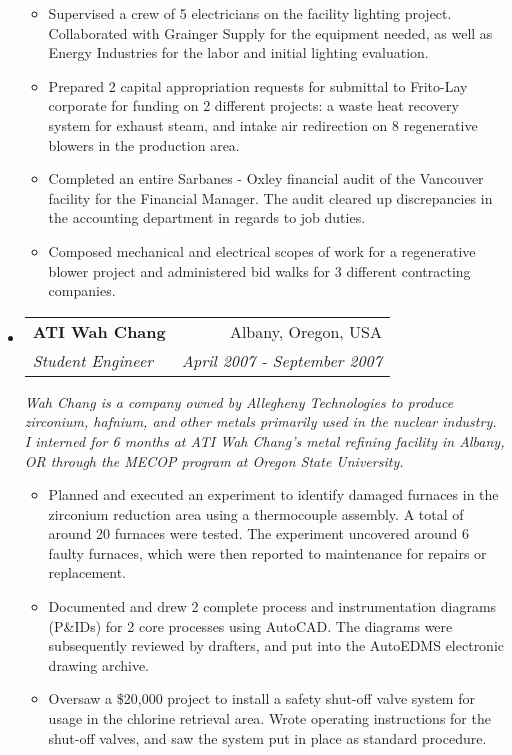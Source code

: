 \documentclass[a4paper,11pt]{article}
\makeatletter
\newcommand{\resitem}[1]{\item #1 \vspace{-2pt}}
\newcommand{\ressubheading}[4]{
\begin{tabular*}{6.5in}{l@{\cftdotfill{\cftsecdotsep}\extracolsep{\fill}}r}
		\textbf{#1} & #2 \\
		\textit{#3} & \textit{#4} \\
\end{tabular*}\vspace{-6pt}}
\makeatother
\begin{document}
\begin{itemize}
\begin{itemize}
			\resitem{Supervised a crew of 5 electricians on the facility lighting project. Collaborated with Grainger Supply for the equipment needed, as well as Energy Industries for the labor and initial lighting evaluation.}

			\resitem{Prepared 2 capital appropriation requests for submittal to Frito-Lay corporate for funding on 2 different projects: a waste heat recovery system for exhaust steam, and intake air redirection on 8 regenerative blowers in the production area.}

			\resitem{Completed an entire Sarbanes - Oxley financial audit of the Vancouver facility for the Financial Manager. The audit cleared up discrepancies in the accounting department in regards to job duties.}

			\resitem{Composed mechanical and electrical scopes of work for a regenerative blower project and administered bid walks for 3 different contracting companies.}

	\end{itemize}

\item

	\ressubheading{ATI Wah Chang}{Albany, Oregon, USA}{Student Engineer}{April 2007 - September 2007}
	\linebreak
	\linebreak
	\emph{Wah Chang is a company owned by Allegheny Technologies to produce zirconium, hafnium, and other metals primarily used in the nuclear industry. I interned for 6 months at ATI Wah Chang’s metal refining facility in Albany, OR through the MECOP program at Oregon State University.}
	\begin{itemize}
			\resitem{Planned and executed an experiment to identify damaged furnaces in the zirconium reduction area using a thermocouple assembly. A total of around 20 furnaces were tested. The experiment uncovered around 6 faulty furnaces, which were then reported to maintenance for repairs or replacement.}

			\resitem{Documented and drew 2 complete process and instrumentation diagrams (P\&IDs) for 2 core processes using AutoCAD. The diagrams were subsequently reviewed by drafters, and put into the AutoEDMS electronic drawing archive.}

			\resitem{Oversaw a \$20,000 project to install a safety shut-off valve system for usage in the chlorine retrieval area. Wrote operating instructions for the shut-off valves, and saw the system put in place as standard procedure.}

	\end{itemize}

\end{itemize}
\end{document}

